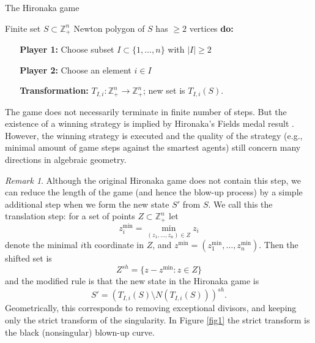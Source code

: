 \documentclass{article}
\theoremstyle{plain}
\theoremstyle{definition}
\theoremstyle{remark}
\newtheorem{remark}[theorem]{Remark}
\newcommand{\ZZ}{{\mathbb{Z}}}
\begin{document}
\begin{algorithm}[tb]
   \caption{The Hironaka game}
   \label{alg:example}
\begin{algorithmic}
    Finite set $S\subset \ZZ_+^n$
    Newton polygon of $S$ has $\ge 2$ vertices \textbf{do:}
   
    \textbf{\ \ \ Player 1:} Choose subset $I\subset \{1,\ldots, n\}$ with $|I|\ge 2$
    
    \textbf{\ \ \ Player 2:} Choose an element $i\in I$
    
    \textbf{\ \ \ Transformation:} $T_{I,i}: \ZZ_+^n \to \ZZ_+^n$; new set is $T_{I,i}(S)$.
\end{algorithmic}
\end{algorithm}
 
 
 
The game does not necessarily terminate in finite number of steps. But the existence of a winning strategy is implied by Hironaka's Fields medal result \cite{hironaka}. However, the winning strategy is executed and the quality of the strategy (e.g., minimal amount of game steps against the smartest agents) still concern many directions in algebraic geometry.

\begin{remark}
Although the original Hironaka game does not contain this step, we can reduce the length of the game (and hence the blow-up process) by a simple additional step when we form the new state $S'$ from $S$. We call this the translation step: for a set of points $Z \subset \ZZ_+^n$ let 
\[z_i^{\min}=\min_{(z_1,\ldots, z_n)\in Z} z_i\]
denote the minimal $i$th coordinate in $Z$, and $z^{\min}=(z_1^{\min},\ldots, z_n^{\min})$. Then the shifted set is  
\[Z^{sh}=\{z-z^{\min}: z\in Z\}\]
and the modified rule is that the new state in the Hironaka game is 
\[S'=(T_{I,i}(S) \setminus N(T_{I,i}(S)))^{sh}.\]
Geometrically, this corresponds to removing exceptional divisors, and keeping only the strict transform of the singularity. In Figure \ref{fig1} the strict transform is the black (nonsingular) blown-up curve.
\end{remark}

\end{document}
